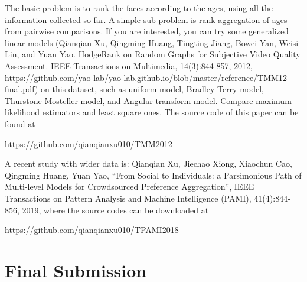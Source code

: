 \documentclass[11pt]{article}
\begin{document}
The basic problem is to rank the faces according to the ages, using all the information collected so far. A simple sub-problem is rank aggregation of ages from pairwise comparisons. If you are interested, you can try some generalized linear models (Qianqian Xu, Qingming Huang, Tingting Jiang, Bowei Yan, Weisi Lin, and Yuan Yao. HodgeRank on Random Graphs for Subjective Video Quality Assessment. IEEE Transactions on Multimedia, 14(3):844-857, 2012, \url{https://github.com/yao-lab/yao-lab.github.io/blob/master/reference/TMM12-final.pdf}) on this dataset, such as uniform model, Bradley-Terry model, Thurstone-Mosteller model, and Angular transform model. Compare maximum likelihood estimators and least square ones. The source code of this paper can be found at

\url{https://github.com/qianqianxu010/TMM2012} 

A recent study with wider data is: Qianqian Xu, Jiechao Xiong, Xiaochun Cao, Qingming Huang, Yuan Yao, “From Social to Individuals: a Parsimonious Path of Multi-level Models for Crowdsourced Preference Aggregation”, IEEE Transactions on Pattern Analysis and Machine Intelligence (PAMI), 41(4):844-856, 2019, where the source codes can be downloaded at

\url{https://github.com/qianqianxu010/TPAMI2018}


\newpage 

\section{Final Submission}
\end{document}
